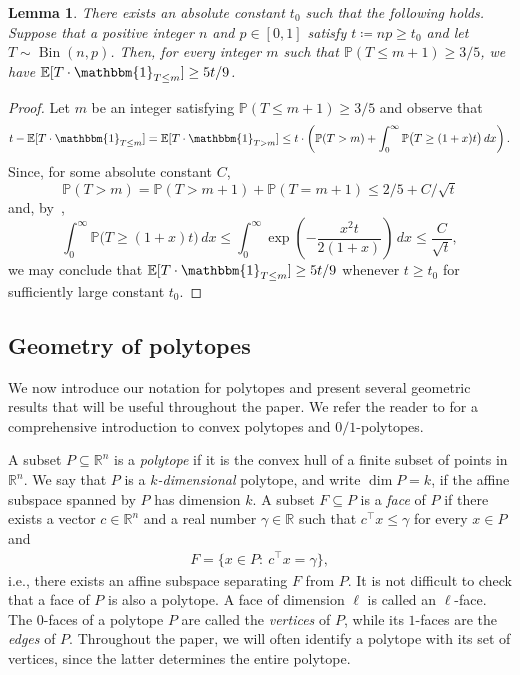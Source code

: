 \documentclass[11pt,a4paper,oneside,reqno]{amsart}
\newtheorem{lemma}[theorem]{Lemma}
\newcommand{\RR}{\mathbb{R}}
\newcommand{\PP}{\mathbb{P}}
\DeclareMathOperator{\Bin}{Bin}
\def\1{\mathbbm{1}}
\begin{document}
\begin{lemma}
  \label{lemma:binomial-tilt}
  There exists an absolute constant $t_0$ such that the following holds.
  Suppose that a positive integer $n$ and $p \in [0,1]$ satisfy $t \coloneqq np \ge t_0$ and let $T \sim \Bin(n,p)$.
  Then, for every integer $m$ such that $\PP(T \le m+1) \ge 3/5$, we have $\mathbb{E}[T \cdot \1_{T \le m}] \ge 5t/9$.
\end{lemma}
\begin{proof}
  Let $m$ be an integer satisfying $\PP(T \le m+1) \ge 3/5$ and observe that
  \[
    t - \mathbb{E}[T \cdot \1_{T \le m}] = \mathbb{E}[T \cdot \1_{T > m}] \le t \cdot \left(\PP(T > m) + \int_{0}^{\infty} \PP\bigl(T \ge (1+x)t\bigr)\, dx\right).
  \]
  Since, for some absolute constant $C$,
  \[
    \PP(T > m) = \PP(T > m+1) + \PP(T = m+1) \le 2/5 + C/\sqrt{t}
  \]
  and, by~,
  \[
    \int_{0}^{\infty} \PP\bigl(T \ge (1+x)t\bigr)\, dx \le \int_{0}^{\infty} \exp\left(-\frac{x^2t}{2(1+x)}\right) \, dx \le \frac{C}{\sqrt{t}},
  \]
  we may conclude that $\mathbb{E}[T \cdot \1_{T \le m}] \ge 5t/9$ whenever $t \ge t_0$ for sufficiently large constant $t_0$.
\end{proof}

\subsection{Geometry of polytopes}\label{subsec:geometry}

We now introduce our notation for polytopes and present several geometric results that will be useful throughout the paper. We refer the reader to \cites{lecturepolytopes, lectures01polytopes} for a comprehensive introduction to convex polytopes and $0/1$-polytopes.

A subset $P\subseteq \RR^n$ is a \emph{polytope} if it is the convex hull of a finite subset of points in $\RR^n$.  We say that $P$ is a \emph{$k$-dimensional} polytope, and write $\dim P=k$, if the affine subspace spanned by $P$ has dimension $k$.  A subset $F\subseteq P$ is a \emph{face} of $P$ if there exists a vector $c\in \RR^n$ and a real number $\gamma \in \RR$ such that $c^\top x\leq \gamma$ for every $x \in P$ and
\begin{align}\label{eq:face}
  F=\{x\in P:\: c^\top x= \gamma\},
\end{align}
i.e., there exists an affine subspace separating $F$ from $P$. It is not difficult to check that a face of $P$ is also a polytope. A face of dimension $\ell$ is called an $\ell$-face.  The $0$-faces of a polytope $P$ are called the \emph{vertices} of $P$, while its $1$-faces are the \emph{edges} of $P$.  Throughout the paper, we will often identify a polytope with its set of vertices, since the latter determines the entire polytope.
\end{document}
